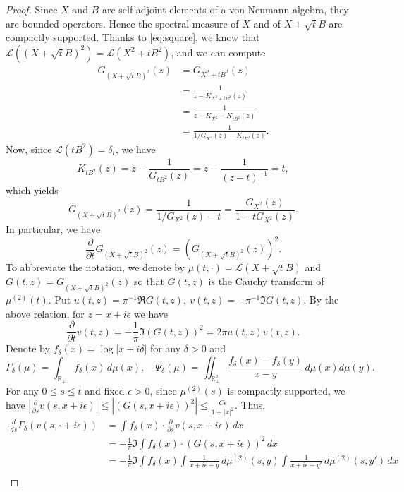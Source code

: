 \documentclass[10pt, reqno]{amsart}
\numberwithin{equation}{section}
\theoremstyle{definition}
\theoremstyle{plain}
\theoremstyle{remark}
\newcommand{\R}{\mathbb{R}}
\newcommand{\1}{\mathbbm{1}}
\begin{document}
	\begin{proof}
Since 
$X$ and $B$ are self-adjoint elements of a von Neumann algebra, they are bounded operators. Hence the spectral measure of $X$ and of $X+\sqrt{t}B$ are compactly supported. Thanks to \eqref{eq:square}, we know that $\mathcal{L}((X+\sqrt{t}B)^2)=\mathcal{L}(X^2+t B^2)$, and we can compute
\begin{align*}
    G_{(X+\sqrt{t}B)^2}(z) &=G_{X^2+tB^2}(z)\\
    &=\frac{1}{z-K_{X^2+tB^2}(z)}\\
    &=\frac{1}{z-K_{X^2}-K_{tB^2}(z)}\\
    &=\frac{1}{1/G_{X^2}(z)-K_{tB^2}(z)}.
\end{align*}
Now,  since $\mathcal{L}(t B^2)=\delta_t$,  we have
$$ K_{tB^2}(z)=z-\frac{1}{G_{tB^2}(z)}
    =z-\frac{1}{(z-t)^{-1}}
    =t,$$
which yields
\begin{equation}G_{(X+\sqrt{t}B)^2}(z)=\frac{1}{1/G_{X^2}(z)-t}=\frac{G_{X^2}(z)}{1-tG_{X^2}(z)}.	\label{eq:Cauchytimet}\end{equation}
In particular, we have
\begin{equation*}
	\frac{\partial }{\partial t}G_{(X+\sqrt{t}B)^2}(z) = (G_{(X+\sqrt{t}B)^2 }(z))^2.
\end{equation*}
To abbreviate the notation, we denote by $\mu(t,\cdot)=\mathcal{L}(X+\sqrt{t}B)$ and $G(t,z)=G_{(X+\sqrt{t}B)^2}(z)$ so that $G(t,z)$ is the Cauchy transform of $\mu^{(2)}(t)$. Put $u(t,z)=\pi^{-1}\Re G(t,z),\ v(t,z)=-\pi^{-1}\Im G(t,z)$, By the above relation, for $z=x+i\epsilon$ we have
\begin{equation*}
	\frac{\partial }{\partial t}v(t,z) = -\frac{1}{\pi}\Im (G(t,z))^2 = 2\pi u(t,z)v(t,z).
\end{equation*}
Denote by $f_\delta(x)=\log |x+i\delta|$ for any $\delta>0$ and $$\Gamma_\delta(\mu)=\int_{\R_+} f_\delta(x)\,d\mu(x),\quad \Psi_\delta(\mu)= \iint_{\R_+^2} \frac{f_\delta(x)-f_\delta(y)}{x-y}\,d\mu(x)d\mu(y).$$
For any $0\le s\le t$ and fixed $\epsilon>0$, since $\mu^{(2)}(s)$ is compactly supported, we have $|\frac{\partial}{\partial s}v(s,x+i\epsilon)|\leq |(G(s,x+i\epsilon))^2|\leq \frac{C\epsilon}{1+|x|^2}$. Thus,
\begin{align*}
	\frac{d}{ds}\Gamma_{\delta}(v(s,\cdot+i\epsilon)) &= \int f_\delta(x)\cdot \frac{\partial}{\partial s}v(s,x+i\epsilon)\,dx\\
    &= -\frac{1}{\pi}\Im \int f_\delta(x)\cdot (G(s,x+i\epsilon))^2\,dx\\
	&= -\frac{1}{\pi}\Im \int f_\delta(x)\int \frac{1}{x+i\epsilon-y}\,d\mu^{(2)}(s,y)\int \frac{1}{x+i\epsilon-y'}\,d\mu^{(2)}(s,y')\,dx\\

\end{align*}
\end{proof}
\end{document}
